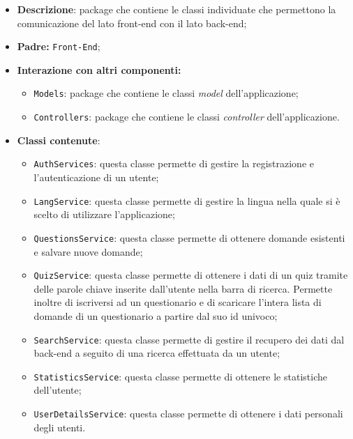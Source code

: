 \begin{itemize}
	\item \textbf{Descrizione}: package che contiene le classi individuate che permettono la comunicazione del lato front-end con il lato back-end;
	\item \textbf{Padre:} \texttt{Front-End};
	\item \textbf{Interazione con altri componenti:}
	\begin{itemize}
		\item \texttt{Models}: package che contiene le classi \textit{model} dell'applicazione;
		\item \texttt{Controllers}: package che contiene le classi \textit{controller} dell'applicazione.
	\end{itemize}
	\item \textbf{Classi contenute}:
	\begin{itemize}
		\item \texttt{AuthServices}: questa classe permette di gestire la registrazione e l'autenticazione di un utente;
		\item \texttt{LangService}: questa classe permette di gestire la lingua nella quale si è scelto di utilizzare l'applicazione;
		\item \texttt{QuestionsService}: questa classe permette di ottenere domande esistenti e salvare nuove domande;
		\item \texttt{QuizService}: questa classe permette di ottenere i dati di un quiz tramite delle parole chiave inserite dall'utente nella barra di ricerca. Permette inoltre di iscriversi ad un questionario e di scaricare l'intera lista di domande di un questionario a partire dal suo id univoco;
		\item \texttt{SearchService}: questa classe permette di gestire il recupero dei dati dal back-end a seguito di una ricerca effettuata da un utente;
		\item \texttt{StatisticsService}: questa classe permette di ottenere le statistiche dell'utente;
		\item \texttt{UserDetailsService}: questa classe permette di ottenere i dati personali degli utenti.
	\end{itemize} 
\end{itemize}